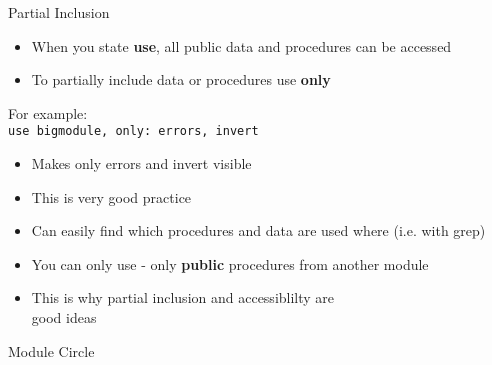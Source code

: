 \documentclass{beamer}
\begin{document}
\begin{frame}{Partial Inclusion}

  \begin{itemize}
    \item When you state \textbf{use}, all public data and procedures can be accessed
    \vfill\item To partially include data or procedures use \textbf{only}
  \end{itemize}
  \vfill
  For example: \\
  \texttt{use bigmodule, only: errors, invert}
  \begin{itemize}
    \vfill\item  Makes only errors and invert visible
    \vfill\item  This is very good practice
    \vfill\item  Can easily find which procedures and data are used where (i.e. with grep)
    \vfill\item  You can only use - only \textbf{public} procedures from another module
    \vfill\item  This is why partial inclusion and accessiblilty are \\ good ideas
  \end{itemize}

\end{frame}
\begin{frame}[allowframebreaks]{Module Circle}
\begin{scriptsize}
  
  
\end{scriptsize}
\end{frame}
\end{document}
